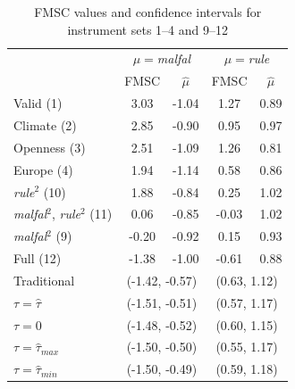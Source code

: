 \documentclass[12pt]{article}
\theoremstyle{definition}
\begin{document}
\begin{table}[htbp]
\caption{FMSC values and confidence intervals for instrument sets 1--4 and 9--12}
\label{tab:all}
\small
\centering
 \begin{tabular}{lcccc}\hline\hline
 & \multicolumn{2}{c}{$\mu=$\emph{malfal}}& \multicolumn{2}{c}{$\mu=$\emph{rule}}\\
&\multicolumn{1}{c}{FMSC}&\multicolumn{1}{c}{$\widehat{\mu}$}&\multicolumn{1}{c}{FMSC}&\multicolumn{1}{c}{$\widehat{\mu}$}\tabularnewline
\hline
Valid (1)& 3.03&-1.04& 1.27&0.89\tabularnewline
Climate (2)& 2.85&-0.90& 0.95&0.97\tabularnewline
Openness (3)& 2.51&-1.09& 1.26&0.81\tabularnewline
Europe (4)& 1.94&-1.14& 0.58&0.86\tabularnewline
\emph{rule}$^2$ (10)& 1.88&-0.84& 0.25&1.02\tabularnewline
\emph{malfal}$^2$, \emph{rule}$^2$ (11)& 0.06&-0.85&-0.03&1.02\tabularnewline
\emph{malfal}$^2$ (9)&-0.20&-0.92& 0.15&0.93\tabularnewline
Full (12)&-1.38&-1.00&-0.61&0.88\tabularnewline
\hline
Traditional&\multicolumn{2}{c}{(-1.42, -0.57)}&\multicolumn{2}{c}{(0.63, 1.12)}\\
$\tau = \widehat{\tau}$&\multicolumn{2}{c}{(-1.51, -0.51)}&\multicolumn{2}{c}{(0.57, 1.17)}\\
$\tau = 0$&\multicolumn{2}{c}{(-1.48, -0.52)}&\multicolumn{2}{c}{(0.60, 1.15)}\\
$\tau = \widehat{\tau}_{max}$&\multicolumn{2}{c}{(-1.50, -0.50)}&\multicolumn{2}{c}{(0.55, 1.17)}\\
$\tau = \widehat{\tau}_{min}$&\multicolumn{2}{c}{(-1.50, -0.49)}&\multicolumn{2}{c}{(0.59, 1.18)}\\
\hline
\end{tabular}


\footnotesize
\end{table}











\appendix


\end{document}
